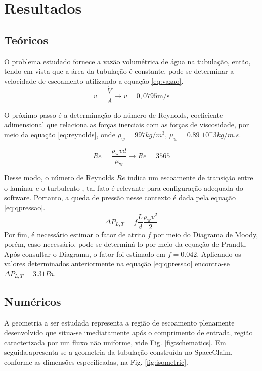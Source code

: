 \documentclass[12pt]{article}
\begin{document}
\section{Resultados}
\subsection{Teóricos}
O problema estudado fornece a vazão volumétrica de água na tubulação, então, tendo em vista que a área da tubulação é constante, pode-se determinar a velocidade de escoamento utilizando a equação \ref{eq:vazao}.
\begin{equation}
v=\frac{\dot{V}}{A} \rightarrow v=0,0795 \mathrm{m} / \mathrm{s}
\label{eq:vazao}
\end{equation}

O próximo passo é a determinação do número de Reynolds, coeficiente adimensional que relaciona as forças inerciais com as forças de viscosidade, por meio da equação \ref{eq:reynolds}, onde $\rho_{w} = 997 kg/m^3$, $\mu_{w} = 0.89$ $10^-3 kg/m.s$.

\begin{equation}
R e = \frac{\rho_{\text {w}} v d}{\mu_{\text {w}}} \rightarrow R e=3565
\label{eq:reynolds}
\end{equation}

Desse modo, o número de Reynolds $Re$ indica um escoamente de transição entre o laminar e o turbulento \cite{cengel}, tal fato é relevante para configuração adequada do software. Portanto, a queda de pressão nesse contexto é dada pela equação \ref{eq:qpressao}.
\begin{equation}
\Delta P_{L, T} = f \frac{L}{d} \frac{\rho_{\text {w}} v^{2}}{2}
\label{eq:qpressao}
\end{equation}
Por fim, é necessário estimar o fator de atrito $f$ por meio do Diagrama de Moody, porém, caso necessário, pode-se determiná-lo por meio da equação de Prandtl. Após consultar o Diagrama, o fator foi estimado em $f = 0.042$. Aplicando os valores determinados anteriormente na equação \ref{eq:qpressao} encontra-se $\Delta P_{L,T} = 3.31 Pa$.


\subsection{Numéricos}

A geometria a ser estudada representa a região de escoamento plenamente desenvolvido que situa-se imediatamente após o comprimento de entrada, região caracterizada por um fluxo não uniforme, vide Fig. \ref{fig:schematics}. Em seguida,apresenta-se a geometria da tubulação construída no SpaceClaim, conforme as dimensões especificadas, na Fig. \ref{fig:isometric}.
\end{document}

